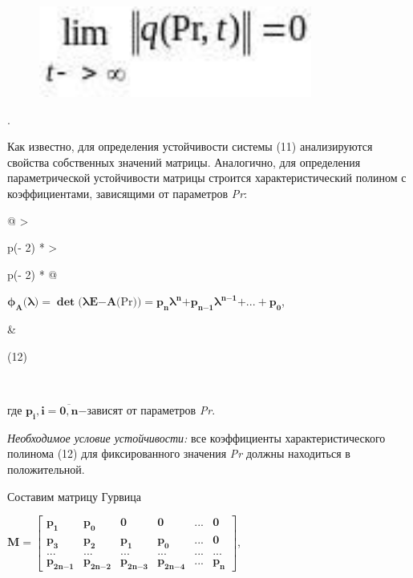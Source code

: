 \begin{figure}[H]
	\centering
	\includegraphics[width=0.8\textwidth]{assets/147}
	\caption*{}
\end{figure}.

Как известно, для определения устойчивости системы (11) анализируются
свойства собственных значений матрицы. Аналогично, для определения
параметрической устойчивости матрицы строится характеристический полином
с коэффициентами, зависящими от параметров \emph{Pr}:

\begin{longtable}[]{@{}
  >{\raggedright\arraybackslash}p{(\columnwidth - 2\tabcolsep) * }
  >{\raggedright\arraybackslash}p{(\columnwidth - 2\tabcolsep) * }@{}}
\toprule\noalign{}
\begin{minipage}[b]{\linewidth}\raggedright
\(\mathbf{\phi}_{\mathbf{A}}\mathbf{(}\mathbf{\lambda}\mathbf{) =}\mathbf{\det}\mathbf{(}\mathbf{\lambda E}\mathbf{-}\mathbf{A}\mathbf{(}\text{Pr}\mathbf{)) =}\mathbf{p}_{\mathbf{n}}\mathbf{\lambda}^{\mathbf{n}}\mathbf{+}\mathbf{p}_{\mathbf{n}\mathbf{-}\mathbf{1}}\mathbf{\lambda}^{\mathbf{n}\mathbf{-}\mathbf{1}}\mathbf{+ ... +}\mathbf{p}_{\mathbf{0}}\),
\end{minipage} & \begin{minipage}[b]{\linewidth}\raggedright
(12)
\end{minipage} \\
\midrule\noalign{}
\endhead
\bottomrule\noalign{}
\endlastfoot
\end{longtable}

где
\(\mathbf{p}_{\mathbf{i}}\mathbf{,i =}\overline{\mathbf{0,n}}\mathbf{-}\)зависят
от параметров \emph{Pr}.

\emph{Необходимое условие устойчивости:} все коэффициенты
характеристического полинома (12) для фиксированного значения \emph{Pr}
должны находиться в положительной.

Составим матрицу Гурвица

\(\mathbf{M =}\begin{bmatrix}
\mathbf{p}_{\mathbf{1}} & \mathbf{p}_{\mathbf{0}} & \mathbf{0} & \mathbf{0} & \mathbf{...} & \mathbf{0} \\
\mathbf{p}_{\mathbf{3}} & \mathbf{p}_{\mathbf{2}} & \mathbf{p}_{\mathbf{1}} & \mathbf{p}_{\mathbf{0}} & \mathbf{...} & \mathbf{0} \\
\mathbf{...} & \mathbf{...} & \mathbf{...} & \mathbf{...} & \mathbf{...} & \mathbf{...} \\
\mathbf{p}_{\mathbf{2}\mathbf{n}\mathbf{-}\mathbf{1}} & \mathbf{p}_{\mathbf{2}\mathbf{n}\mathbf{-}\mathbf{2}} & \mathbf{p}_{\mathbf{2}\mathbf{n}\mathbf{-}\mathbf{3}} & \mathbf{p}_{\mathbf{2}\mathbf{n}\mathbf{-}\mathbf{4}} & \mathbf{...} & \mathbf{p}_{\mathbf{n}}
\end{bmatrix}\),

